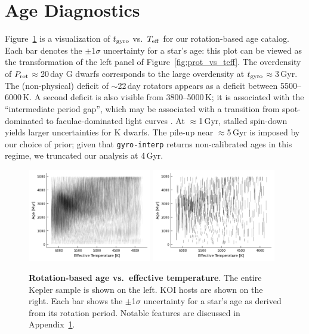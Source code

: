 \documentclass[11pt,twocolumn,tighten]{aastex63}
\begin{document}
\section{Age Diagnostics}
\label{app:age_diagnostic}

Figure~\ref{fig:gyroage_vs_teff} is a visualization of $t_{\rm gyro}$
vs.~$T_{\rm eff}$ for our rotation-based age catalog. 
Each bar denotes the $\pm$1$\sigma$ uncertainty for a star's
age:
this plot can be viewed as the transformation of
the left panel of Figure~\ref{fig:prot_vs_teff}.
The overdensity of $P_{\rm rot}$$\approx$20\,day G dwarfs corresponds
to the large overdensity at $t_{\rm gyro}$$\approx$3\,Gyr.
The (non-physical) deficit of $\sim$22\,day rotators appears as a
deficit between 5500--6000\,K.
A second deficit is also visible from 3800--5000\,K;
it is associated with the ``intermediate period gap'', which may be
associated with a transition from spot-dominated to faculae-dominated
light curves \citep[e.g.][]{Reinhold2019}.
At $\approx$1\,Gyr, stalled spin-down yields larger uncertainties for
K dwarfs.
The pile-up near $\approx$5\,Gyr is imposed by our choice of prior;
given that \texttt{gyro-interp} returns non-calibrated ages in this
regime, we truncated our analysis at 4\,Gyr.

\begin{figure}[!t]
  \begin{center}
    \leavevmode
        \includegraphics[width=0.48\textwidth]{gyroage_vs_teff_errs_linear.png}
    \includegraphics[width=0.48\textwidth]{gyroage_vs_teff_errs_showplanets_linear.png}
  \end{center}
  \vspace{-0.6cm}
  \caption{
    {\bf Rotation-based age vs.~effective temperature}.
    The entire Kepler sample is shown on the left.
    KOI hosts are shown on the right.
    Each bar shows the $\pm$1$\sigma$ uncertainty for a star's age as
    derived from its rotation period.  
    Notable features are discussed in
    Appendix~\ref{app:age_diagnostic}.
    \label{fig:gyroage_vs_teff}
  }
\end{figure}
\end{document}
